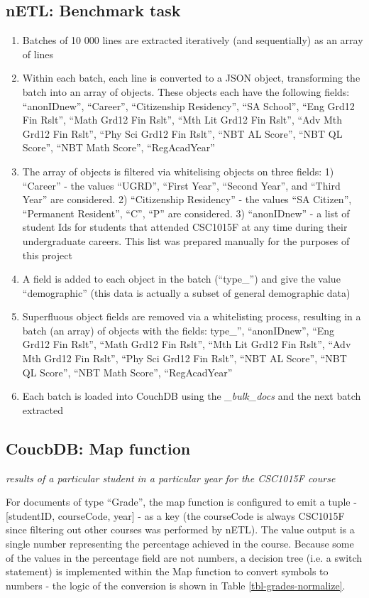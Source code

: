\subsection*{nETL: Benchmark task}
\begin{enumerate}
    \item Batches of 10 000 lines are extracted iteratively (and sequentially) as an array of lines
    \item Within each batch, each line is converted to a JSON object, transforming the batch into an array of objects. These objects each have the following fields: ``anonIDnew'', ``Career'', ``Citizenship Residency'', ``SA School'', ``Eng Grd12 Fin Rslt'', ``Math Grd12 Fin Rslt'', ``Mth Lit Grd12 Fin Rslt'', ``Adv Mth Grd12 Fin Rslt'', ``Phy Sci Grd12 Fin Rslt'', ``NBT AL Score'', ``NBT QL Score'', ``NBT Math Score'', ``RegAcadYear''
    \item The array of objects is filtered via whitelising objects on three fields: 1) ``Career'' - the values ``UGRD'', ``First Year'', ``Second Year'', and ``Third Year'' are considered. 2) ``Citizenship Residency'' - the values ``SA Citizen'', ``Permanent Resident'', ``C'', ``P'' are considered. 3) ``anonIDnew'' - a list of student Ids for students that attended CSC1015F at any time during their undergraduate careers. This list was prepared manually for the purposes of this project
    \item A field is added to each object in the batch (``type\_'') and give the value ``demographic'' (this data is actually a subset of general demographic data)
    \item Superfluous object fields are removed via a whitelisting process, resulting in a batch (an array) of objects with the fields: type\_'', ``anonIDnew'', ``Eng Grd12 Fin Rslt'', ``Math Grd12 Fin Rslt'', ``Mth Lit Grd12 Fin Rslt'', ``Adv Mth Grd12 Fin Rslt'', ``Phy Sci Grd12 Fin Rslt'', ``NBT AL Score'', ``NBT QL Score'', ``NBT Math Score'', ``RegAcadYear''
    \item Each batch is loaded into CouchDB using the \textit{\_bulk\_docs} and the next batch extracted
\end{enumerate}

\subsection*{CoucbDB: Map function}
\textit{results of a particular student in a particular year for the CSC1015F course}

For documents of type ``Grade'', the map function is configured to emit a tuple - [studentID, courseCode, year] - as a key (the courseCode is always CSC1015F since filtering out other courses was performed by nETL). The value output is a single number representing the percentage achieved in the course. Because some of the values in the percentage field are not numbers, a decision tree (i.e. a switch statement) is implemented within the Map function to convert symbols to numbers - the logic of the conversion is shown in Table \ref{tbl-grades-normalize}.

